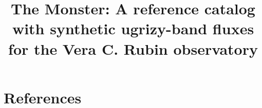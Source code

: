\documentclass[DM,authoryear,toc]{lsstdoc}
\title{The Monster: A reference catalog with synthetic ugrizy-band fluxes for the Vera C. Rubin observatory}
\date{\vcsDate}
\begin{document}
\newcommand{\FIXME}[1]{{\bf \textcolor{red}{#1}}}
\maketitle



\clearpage
\appendix
\section{References} \label{sec:bib}
\renewcommand{\refname}{} %


\clearpage


%
\end{document}
